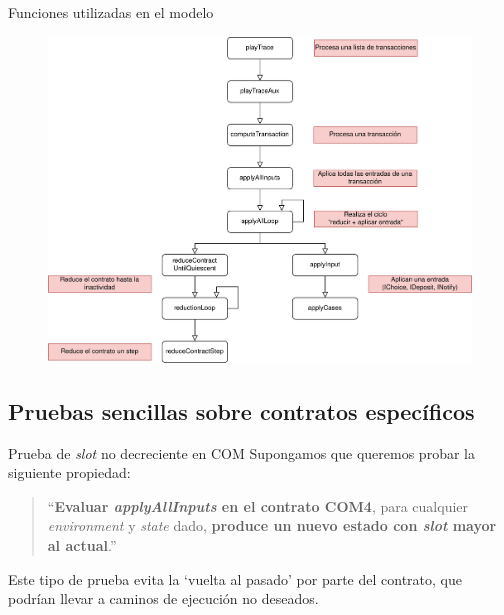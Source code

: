 \documentclass{beamer}
\begin{document}
{\begin{frame}[fragile]{Funciones utilizadas en el modelo}
{\begin{figure}[H]
        \includegraphics[height=0.8\textheight]{Dependencias_Isabelle_Marlowe_6.png}
    \end{figure}
}


\end{frame}
}




\subsection{Pruebas sencillas sobre contratos específicos}

\begin{frame}{Prueba de \textit{slot} no decreciente en COM}
Supongamos que queremos probar la siguiente propiedad:
\vfill
\begin{quote} 
``\textbf{Evaluar \textit{applyAllInputs} en el contrato COM4}, para cualquier \textit{environment} y \textit{state} dado, \textbf{produce un nuevo estado con \textit{slot} mayor al actual}.''
\end{quote}

\vfill

Este tipo de prueba evita la `vuelta al pasado' por parte del contrato, que podrían llevar a caminos de ejecución no deseados.

\end{frame}
\end{document}

